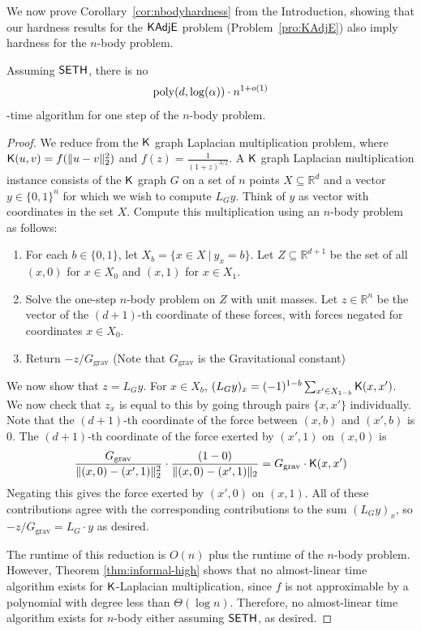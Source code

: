We now prove Corollary~\ref{cor:nbodyhardness} from the Introduction, showing that our hardness results for the $\mathsf{KAdjE}$ problem (Problem~\ref{pro:KAdjE}) also imply hardness for the $n$-body problem.

\begin{corollary}
Assuming $\mathsf{SETH}$, there is no 
\begin{align*}
\mathrm{poly}( d,\log(\alpha) ) \cdot n^{1+o(1)}
\end{align*}-time algorithm for one step of the $n$-body problem. 
\end{corollary}

\begin{proof}
We reduce from the $\mathsf{K}$ graph Laplacian multiplication problem, where $\mathsf{K}(u,v) = f(\|u - v\|_2^2)$ and $f(z) = \frac{1}{(1 + z)^{3/2}}$. A $\mathsf{K}$ graph Laplacian multiplication instance consists of the $\mathsf{K}$ graph $G$ on a set of $n$ points $X\subseteq \mathbb{R}^d$ and a vector $y\in \{0,1\}^n$ for which we wish to compute $L_Gy$. Think of $y$ as vector with coordinates in the set $X$. Compute this multiplication using an $n$-body problem as follows:

\begin{enumerate}
    \item For each $b\in \{0,1\}$, let $X_b = \{x\in X ~|~ y_x = b\}$. Let $Z\subseteq \mathbb{R}^{d+1}$ be the set of all $(x,0)$ for $x\in X_0$ and $(x,1)$ for $x \in X_1$.
    \item Solve the one-step $n$-body problem on $Z$ with unit masses. Let $z \in \mathbb{R}^n$ be the vector of the $(d+1)$-th coordinate of these forces, with forces negated for coordinates $x \in X_0$.
    \item Return $-z/G_{\text{grav}}$ (Note that $G_{\text{grav}}$ is the Gravitational constant)
\end{enumerate}

We now show that $z = L_G y$. For $x\in X_b$, $(L_G y)_{x} = (-1)^{1-b} \sum_{x'\in X_{1-b}} \mathsf{K}(x,x')$. We now check that $z_x$ is equal to this by going through pairs $\{x,x'\}$ individually. Note that the $(d+1)$-th coordinate of the force between $(x,b)$ and $(x',b)$ is 0. The $(d+1)$-th coordinate of the force exerted by $(x',1)$ on $(x,0)$ is 
\begin{align*}
\frac{ G_{\text{grav}} }{\|(x,0)-(x',1)\|_2^2} \cdot \frac{(1-0)}{\|(x,0)-(x',1)\|_2} = G_{\text{grav}} \cdot \mathsf{K}(x,x')
\end{align*}
Negating this gives the force exerted by $(x',0)$ on $(x,1)$. All of these contributions agree with the corresponding contributions to the sum $(L_Gy)_x$, so $-z/G_{\text{grav}} = L_G \cdot y$ as desired.

The runtime of this reduction is $O(n)$ plus the runtime of the $n$-body problem. However, Theorem \ref{thm:informal-high} shows that no almost-linear time algorithm exists for $\mathsf{K}$-Laplacian multiplication, since $f$ is not approximable by a polynomial with degree less than $\Theta(\log n)$. Therefore, no almost-linear time algorithm exists for $n$-body either assuming $\mathsf{SETH}$, as desired.
\end{proof}



